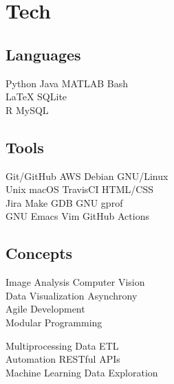 \documentclass[]{jidicula-resume}
\begin{document}
\section{Tech}
\begin{minipage}[t]{.32\textwidth}
  \subsection{Languages}
  Python \textbullet{} Java \textbullet{} MATLAB \textbullet{} Bash  \\
  \LaTeX \textbullet{} SQLite \\
  R \textbullet{} MySQL
  \sectionsep
\end{minipage}
\hfill
\begin{minipage}[t]{.32\textwidth}
  \subsection{Tools}
  Git/GitHub \textbullet{} AWS \textbullet{} {Debian GNU/Linux} \\
  Unix \textbullet{} macOS \textbullet{} TravisCI \textbullet{} HTML/CSS \\
  Jira \textbullet{} Make \textbullet{} GDB \textbullet{} GNU gprof \\
  GNU Emacs \textbullet{} Vim \textbullet{} GitHub Actions
  \sectionsep
\end{minipage}
\hfill
\begin{minipage}[t]{.32\textwidth}
  \subsection{Concepts}
  Image Analysis \textbullet{} Computer Vision \\
  Data Visualization \textbullet{} Asynchrony \\
  Agile Development \\
  Modular Programming
  
  Multiprocessing \textbullet{} Data ETL \\
  Automation \textbullet{}  RESTful APIs \\
  Machine Learning \textbullet{} Data Exploration
  \sectionsep
\end{minipage}

\newpage
\end{document}
